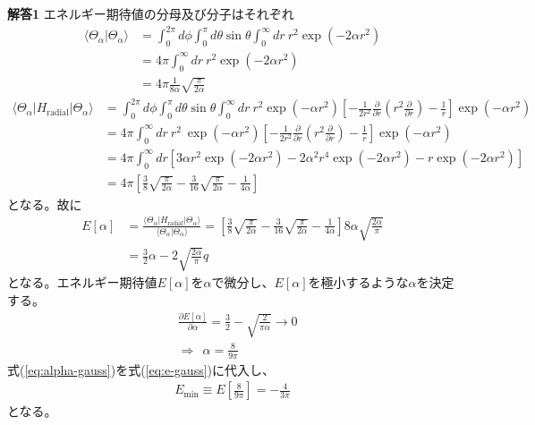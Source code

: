 \documentclass[11pt,pra,aps]{revtex4}
\begin{document}
\noindent
{\bf 解答1}
エネルギー期待値の分母及び分子はそれぞれ
\begin{align}
  \langle\Theta_\alpha|\Theta_\alpha\rangle&=\int_0^{2\pi}d\phi\int_0^\pi d\theta\sin\theta\int_0^\infty dr \ r^2 \exp(-2\alpha r^2) \nonumber \\ 
  &=4\pi\int_0^\infty dr \ r^2 \exp(-2\alpha r^2) \nonumber \\
  &=4\pi\frac{1}{8\alpha}\sqrt{\frac{\pi}{2\alpha}}
\end{align}
\begin{align}
  \langle\Theta_\alpha|H_\text{radial}|\Theta_\alpha\rangle&=\int_0^{2\pi}d\phi\int_0^\pi d\theta\sin\theta\int_0^\infty dr \ r^2 \exp(-\alpha r^2) \left[ -\frac{1}{2r^2}\frac{\partial}{\partial r}\left(r^2 \frac{\partial}{\partial r}\right) - \frac{1}{r} \right]\exp(-\alpha r^2)\nonumber \\
  &=4\pi\int_0^\infty dr \ r^2 \ \exp(-\alpha r^2) \left[ -\frac{1}{2r^2}\frac{\partial}{\partial r}\left(r^2 \frac{\partial}{\partial r}\right) - \frac{1}{r} \right]\exp(-\alpha r^2)\nonumber \\
  &=4\pi\int_0^\infty dr \left[ 3\alpha r^2 \exp(-2\alpha r^2) - 2\alpha^2 r^4 \exp(-2\alpha r^2) - r \exp(-2\alpha r^2) \right] \nonumber \\
  &=4\pi\left[ \frac{3}{8}\sqrt{\frac{\pi}{2\alpha}} - \frac{3}{16}\sqrt{\frac{\pi}{2\alpha}} - \frac{1}{4\alpha}\right]
\end{align}
となる。故に
\begin{align}
  E[\alpha]&=\frac{\langle\Theta_\alpha|H_\text{radial}|\Theta_\alpha\rangle}{\langle\Theta_\alpha|\Theta_\alpha\rangle}=\left[ \frac{3}{8}\sqrt{\frac{\pi}{2\alpha}} - \frac{3}{16}\sqrt{\frac{\pi}{2\alpha}} - \frac{1}{4\alpha}\right]8\alpha\sqrt{\frac{2\alpha}{\pi}} \nonumber \\
  &=\frac{3}{2}\alpha - 2\sqrt{\frac{2\alpha}{\pi}} \label{eq:e-gauss}q
\end{align}
となる。エネルギー期待値$E[\alpha]$を$\alpha$で微分し、$E[\alpha]$を極小するような$\alpha$を決定する。
\begin{align}
  &\frac{\partial E[\alpha]}{\partial\alpha}=\frac{3}{2}-\sqrt{\frac{2}{\pi\alpha}}\rightarrow 0 \\
  &\Rightarrow \ \ \alpha=\frac{8}{9\pi} \label{eq:alpha-gauss}
\end{align}
式(\ref{eq:alpha-gauss})を式(\ref{eq:e-gauss})に代入し、
\begin{align}
  E_\text{min}\equiv E\left[\frac{8}{9\pi}\right]=-\frac{4}{3\pi}
\end{align}
となる。
\end{document}
